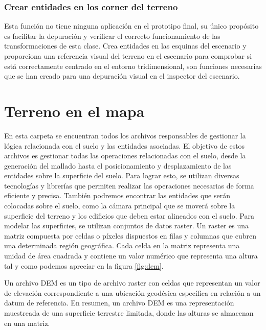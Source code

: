 \documentclass[a4paper, 11pt]{book}
\begin{document}
\subsubsection{Crear entidades en los corner del terreno}
\label{funcion:createCorner}
Esta función no tiene ninguna aplicación en el prototipo final, su único propósito es facilitar la depuración y verificar el correcto funcionamiento de las transformaciones de esta clase. Crea entidades en las esquinas del escenario y proporciona una referencia visual del terreno en el escenario para comprobar si está correctamente centrado en el entorno tridimensional, son funciones necesarias que se han creado para una depuración visual en el inspector del escenario.
\clearpage
\section{Terreno en el mapa}
\label{sec:mapGround}
En esta carpeta se encuentran todos los archivos responsables de gestionar la lógica relacionada con el suelo y las entidades asociadas. El objetivo de estos archivos es gestionar todas las operaciones relacionadas con el suelo, desde la generación del mallado hasta el posicionamiento y desplazamiento de las entidades sobre la superficie del suelo. Para lograr esto, se utilizan diversas tecnologías y librerías que permiten realizar las operaciones necesarias de forma eficiente y precisa.
También podremos encontrar las entidades que serán colocadas sobre el suelo, como la cámara principal que se moverá sobre la superficie del terreno y los edificios que deben estar alineados con el suelo. Para modelar las superficies, se utilizan conjuntos de datos \gls{raster}. Un raster es una matriz compuesta por celdas o píxeles dispuestos en filas y columnas que cubren una determinada región geográfica.
Cada celda en la matriz representa una unidad de área cuadrada y contiene un valor numérico que representa una altura tal y como podemos apreciar en la figura \ref{fig:dem}.

Un archivo DEM es un tipo de archivo raster con celdas que representan un valor de elevación correspondiente a una ubicación geodésica específica en relación a un datum de referencia. En resumen, un archivo DEM es una representación muestreada de una superficie terrestre limitada, donde las alturas se almacenan en una matriz.
\end{document}
